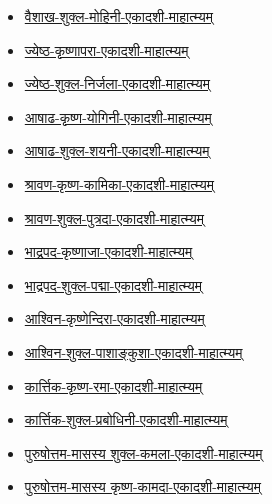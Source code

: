 {\begin{center}
\begin{itemize}
        \item \hyperref[sec:padma-vaishakha-shukla-mohini]{वैशाख-शुक्ल-मोहिनी-एकादशी-माहात्म्यम्}
        \item \hyperref[sec:padma-jyeshtha-krishnapara]{ज्येष्ठ-कृष्णापरा-एकादशी-माहात्म्यम्}
        \item \hyperref[sec:padma-jyeshtha-shukla-nirjala]{ज्येष्ठ-शुक्ल-निर्जला-एकादशी-माहात्म्यम्}
        \item \hyperref[sec:padma-ashadha-krishna-yogini]{आषाढ-कृष्ण-योगिनी-एकादशी-माहात्म्यम्}
        \item \hyperref[sec:padma-ashadha-shukla-shayani]{आषाढ-शुक्ल-शयनी-एकादशी-माहात्म्यम्}
        \item \hyperref[sec:padma-shravana-krishna-kamika]{श्रावण-कृष्ण-कामिका-एकादशी-माहात्म्यम्}
        \item \hyperref[sec:padma-shravana-shukla-putrada]{श्रावण-शुक्ल-पुत्रदा-एकादशी-माहात्म्यम्}
        \item \hyperref[sec:padma-bhadrapada-krishnaja]{भाद्रपद-कृष्णाजा-एकादशी-माहात्म्यम्}
        \item \hyperref[sec:padma-bhadrapada-shukla-padma]{भाद्रपद-शुक्ल-पद्मा-एकादशी-माहात्म्यम्}
        \item \hyperref[sec:padma-ashvina-krishnendira]{आश्विन-कृष्णेन्दिरा-एकादशी-माहात्म्यम्}
        \item \hyperref[sec:padma-ashvina-shukla-pashankusha]{आश्विन-शुक्ल-पाशाङ्कुशा-एकादशी-माहात्म्यम्}
        \item \hyperref[sec:padma-karttika-krishna-rama]{कार्त्तिक-कृष्ण-रमा-एकादशी-माहात्म्यम्}
        \item \hyperref[sec:padma-karttika-shukla-prabodhini]{कार्त्तिक-शुक्ल-प्रबोधिनी-एकादशी-माहात्म्यम्}
        \item \hyperref[sec:padma-purushottama-shukla-kamala]{पुरुषोत्तम-मासस्य शुक्ल-कमला-एकादशी-माहात्म्यम्}
        \item \hyperref[sec:padma-purushottama-krishna-parama]{पुरुषोत्तम-मासस्य कृष्ण-कामदा-एकादशी-माहात्म्यम्}
    \end{itemize}
    \clearpage
    
\end{center}

\clearpage

}
